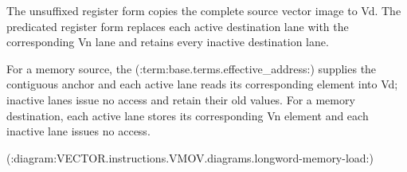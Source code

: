 The unsuffixed register form copies the complete source vector image to Vd.
The predicated register form replaces each active destination lane with the
corresponding Vn lane and retains every inactive destination lane.

For a memory source, the (:term:base.terms.effective_address:) supplies the contiguous anchor and
each active lane reads its corresponding element into Vd; inactive lanes issue
no access and retain their old values. For a memory destination, each active
lane stores its corresponding Vn element and each inactive lane issues no
access.

(:diagram:VECTOR.instructions.VMOV.diagrams.longword-memory-load:)
